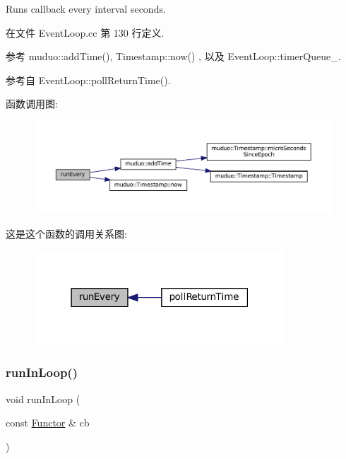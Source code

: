 Runs callback every {\ttfamily interval} seconds. 

在文件 Event\+Loop.\+cc 第 130 行定义.



参考 muduo\+::add\+Time(), Timestamp\+::now() , 以及 Event\+Loop\+::timer\+Queue\+\_\+.



参考自 Event\+Loop\+::poll\+Return\+Time().

函数调用图\+:
\nopagebreak
\begin{figure}[H]
\begin{center}
\leavevmode
\includegraphics[width=350pt]{classmuduo_1_1EventLoop_a7bf9fa6b9440ac1053f475108297264e_cgraph}
\end{center}
\end{figure}
这是这个函数的调用关系图\+:
\nopagebreak
\begin{figure}[H]
\begin{center}
\leavevmode
\includegraphics[width=267pt]{classmuduo_1_1EventLoop_a7bf9fa6b9440ac1053f475108297264e_icgraph}
\end{center}
\end{figure}
\mbox{\label{classmuduo_1_1EventLoop_acf6a4570703c6edf29ae2d28cf6767cb}} 
\subsubsection{\texorpdfstring{run\+In\+Loop()}{runInLoop()}}
{\footnotesize\ttfamily void run\+In\+Loop (\begin{DoxyParamCaption}\item[{const \hyperlink{classmuduo_1_1EventLoop_aa47556388c5bf0b2534c9816841d8e7a}{Functor} \&}]{cb }\end{DoxyParamCaption})}

